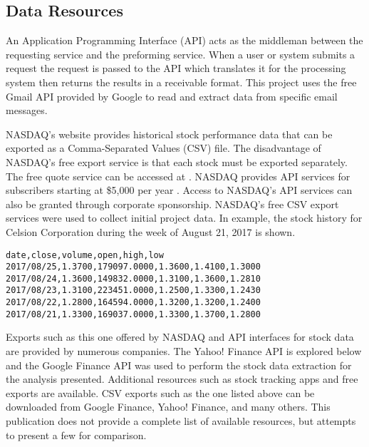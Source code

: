 \documentclass[sigconf]{acmart}
\begin{document}
\subsection{Data Resources}
An Application Programming Interface (API) acts as the middleman between the requesting service and the preforming service. When a user or system submits a request the request is passed to the API which translates it for the processing system then returns the results in a receivable format. This project uses the free Gmail API provided by Google to read and extract data from specific email messages.

NASDAQ's website provides historical stock performance data that can be exported as a Comma-Separated Values (CSV) file. The disadvantage of NASDAQ's free export service is that each stock must be exported separately. The free quote service can be accessed at \cite{www-quotenasdaq}. NASDAQ provides API services for subscribers starting at \$5,000 per year \cite{www-nasdaq-sub}. Access to NASDAQ's API services can also be granted through corporate sponsorship. NASDAQ's free CSV export services were used to collect initial project data. In example, the stock history for Celsion Corporation during the week of August 21, 2017 is shown.

\begin{mdframed}[style=default]
\begin{lstlisting}
date,close,volume,open,high,low
2017/08/25,1.3700,179097.0000,1.3600,1.4100,1.3000
2017/08/24,1.3600,149832.0000,1.3100,1.3600,1.2810
2017/08/23,1.3100,223451.0000,1.2500,1.3300,1.2430
2017/08/22,1.2800,164594.0000,1.3200,1.3200,1.2400
2017/08/21,1.3300,169037.0000,1.3300,1.3700,1.2800
\end{lstlisting}
\end{mdframed} 

Exports such as this one offered by NASDAQ and API interfaces for stock data are provided by numerous companies. The Yahoo! Finance API is explored below and the Google Finance API was used to perform the stock data extraction for the analysis presented. Additional resources such as stock tracking apps and free exports are available. CSV exports such as the one listed above can be downloaded from Google Finance, Yahoo! Finance, and many others. This publication does not provide a complete list of available resources, but attempts to present a few for comparison. 
\end{document}
